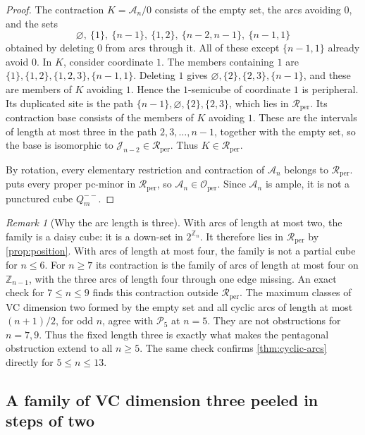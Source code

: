 \documentclass[11pt]{article}
\theoremstyle{definition}
\theoremstyle{remark}
\newtheorem{remark}[theorem]{Remark}
\newcommand{\Rper}{\mathcal R_{\mathrm{per}}}
\newcommand{\Oper}{\mathcal O_{\mathrm{per}}}
\begin{document}
\begin{proof}
The contraction \(K=\mathcal A_n/0\) consists of the empty set, the arcs
avoiding \(0\), and the sets
\[
 \varnothing,\ \{1\},\ \{n-1\},\ \{1,2\},\ \{n-2,n-1\},\ \{n-1,1\}
\]
obtained by deleting \(0\) from arcs through it.  All of these except
\(\{n-1,1\}\) already avoid \(0\).  In \(K\), consider coordinate \(1\).
The members containing \(1\) are \(\{1\},\{1,2\},\{1,2,3\},\{n-1,1\}\).
Deleting \(1\) gives \(\varnothing,\{2\},\{2,3\},\{n-1\}\), and these are
members of \(K\) avoiding \(1\).  Hence the \(1\)-semicube of coordinate
\(1\) is peripheral.  Its duplicated site is the path
\(\{n-1\},\varnothing,\{2\},\{2,3\}\), which lies in \(\Rper\).  Its
contraction base consists of the members of \(K\) avoiding \(1\).  These
are the intervals of length at most three in the path
\(2,3,\ldots,n-1\), together with the empty set, so the base is isomorphic
to \(\mathcal J_{n-2}\in\Rper\).  Thus \(K\in\Rper\).

By rotation, every elementary restriction and contraction of
\(\mathcal A_n\) belongs to \(\Rper\).   puts
every proper pc-minor in \(\Rper\), so \(\mathcal A_n\in\Oper\).  Since
\(\mathcal A_n\) is ample, it is not a punctured cube \(Q_m^{--}\).
\end{proof}

\begin{remark}[Why the arc length is three]
\label{rem:arc-length}
With arcs of length at most two, the family is a daisy cube: it is a
down-set in \(2^{\mathbb Z_n}\).  It therefore lies in \(\Rper\) by
\cref{prop:position}.  With arcs of length at most four, the family is not a
partial cube for \(n\le6\).  For \(n\ge7\) its contraction is the family of
arcs of length at most four on \(\mathbb Z_{n-1}\), with the three arcs of
length four through one edge missing.  An exact check for
\(7\le n\le9\) finds this contraction outside \(\Rper\).  The maximum
classes of VC dimension two formed by the empty set and all cyclic arcs of
length at most \((n+1)/2\), for odd \(n\), agree with \(\mathcal P_5\) at
\(n=5\).  They are not obstructions for \(n=7,9\).  Thus the fixed length
three is exactly what makes the pentagonal obstruction extend to all
\(n\ge5\).  The same check confirms \cref{thm:cyclic-arcs} directly for
\(5\le n\le13\).
\end{remark}

\subsection{A family of VC dimension three peeled in steps of two}
\end{document}
